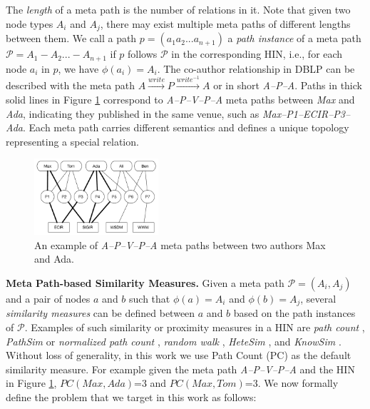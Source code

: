 The \textit{length} of a meta path is the number of relations in it. Note that given two node types $A_i$ and $A_j$, there may exist multiple meta paths of different lengths between them. We call a path $p = (a_1a_2...a_{n+1})$ a \textit{path instance} of a meta path $\mathcal{P} = A_1-A_2... -A_{n+1}$ if $p$ follows $\mathcal{P}$ in the corresponding HIN, i.e., for each node $a_i$ in $p$, we have $\phi(a_i)=A_i$. The co-author relationship in DBLP can be described with the meta path $A\xrightarrow{write}P\xrightarrow{write^{-1}}A$ or in short \textit{A--P--A}. Paths in thick solid lines in Figure \ref{sampleNetwork} correspond to \textit{A--P--V--P--A} meta paths between \textit{Max} and \textit{Ada}, indicating they published in the same venue, such as \textit{Max--P1--ECIR--P3--Ada}. Each meta path carries different semantics and defines a unique topology representing a special relation. %

\begin{figure}[t]
\centering
\includegraphics[width=0.41\textwidth]{figs/exampleSocialNetwork.pdf}
\caption{An example of \textit{A--P--V--P--A} meta paths between two authors Max and Ada.}
\label{sampleNetwork}
\end{figure}


\textbf{Meta Path-based Similarity Measures.} Given a meta path $\mathcal{P} = (A_i,A_j)$ and a pair of nodes $a$ and $b$ such that $\phi(a)=A_i$ and $\phi(b)=A_{j}$, several \textit{similarity measures} can be defined between $a$ and $b$ based on the path instances of $\mathcal{P}$. Examples of such similarity or proximity measures in a HIN are \textit{path count} \cite{sun2011pathsim,sun2011ASONAM}, \textit{PathSim} \cite{sun2011pathsim} or \textit{normalized path count} \cite{sun2011ASONAM}, \textit{random walk} \cite{sun2011ASONAM}, \textit{HeteSim} \cite{shi2014hetesim}, and \textit{KnowSim} \cite{wang2016text}. 
Without loss of generality, in this work we use Path Count (PC) as the default similarity measure. For example given the meta path \textit{A--P--V--P--A} and the HIN in Figure \ref{sampleNetwork}, $PC(Max,Ada)$=3 and $PC(Max,Tom)$=3. We now formally define the problem that we target in this work as follows:

